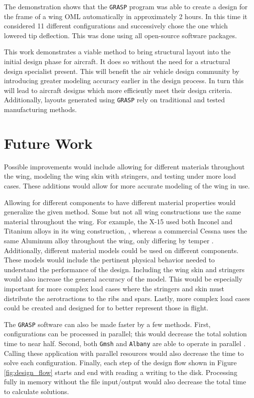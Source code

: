 \documentclass[conf]{new-aiaa}
\begin{document}
The demonstration shows that the \texttt{GRASP} program was able to 
create a design for the frame of a wing OML automatically
in approximately 2 hours. 
In this time it considered 11 different configurations
and successively chose the one which lowered tip deflection.
This was done using all open-source software packages.

This work demonstrates a viable method to bring structural layout 
into the initial design phase for aircraft.
It does so without the need for a structural design 
specialist present.
This will benefit the air vehicle design community 
by introducing greater modeling accuracy 
earlier in the design process. 
In turn this will lead to aircraft designs
which more efficiently meet their design criteria.
Additionally, layouts generated using \texttt{GRASP}
rely on traditional and tested manufacturing methods.


\section{Future Work} \label{sec:future}
Possible improvements would include allowing for different 
materials throughout the wing, modeling the wing skin with stringers, 
and testing under more load cases.
These additions would allow for more accurate modeling 
of the wing in use.

Allowing for different components to have different
material properties would generalize the given method.
Some but not all wing constructions use the same material
throughout the wing. 
For example, the X-15 used both Inconel and Titanium alloys
in its wing construction,
\cite{ kordes_structural_heating_experiences_on_the_x15,
       price_design_report_thermal_protection_system_x15A_2},
whereas a commercial Cessna uses the same Aluminum alloy
throughout the wing, only differing by temper 
\cite{cessna_maintenance_manual_single_engine_models_1996}.
Additionally, different material models could be used 
on different components.
These models would include the pertinent physical behavior
needed to understand the performance of the design.
Including the wing skin and stringers would also 
increase the general accuracy of the model.
This would be especially important for more complex
load cases where the stringers and skin must 
distribute the aerotractions to the ribs and spars.
Lastly, more complex load cases could be
created and designed for to better represent those in flight.

The \texttt{GRASP} software can also be
made faster by a few methods. 
First, configurations can be processed in parallel;
this would decrease the total solution time 
to near half.
Second, both \texttt{Gmsh} and \texttt{Albany}
are able to operate in parallel 
\cite{salinger_albany_using_component_based_design_to_dev_flex_multiphysics,
      geuzaine_GMSH_3D_FE_mesh_generator}.
Calling these application with parallel resources
would also decrease the time to solve each configuration.
Finally, each step of the design flow
shown in Figure \ref{fig:design_flow} starts and
end with reading a writing to the disk. 
Processing fully in memory without the 
file input/output would also 
decrease the total time to calculate solutions.
\end{document}
